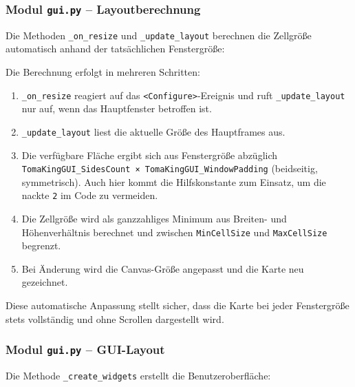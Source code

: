 
\subsubsection{Modul \texttt{gui.py} – Layoutberechnung}

Die Methoden \texttt{\_on\_resize} und \texttt{\_update\_layout} berechnen die Zellgröße automatisch anhand der tatsächlichen Fenstergröße:



Die Berechnung erfolgt in mehreren Schritten:
\begin{enumerate}
    \item \texttt{\_on\_resize} reagiert auf das \texttt{<Configure>}-Ereignis und ruft \texttt{\_update\_layout} nur auf, wenn das Hauptfenster betroffen ist.
    \item \texttt{\_update\_layout} liest die aktuelle Größe des Hauptframes aus.
    \item Die verfügbare Fläche ergibt sich aus Fenstergröße abzüglich \texttt{TomaKingGUI\_SidesCount × TomaKingGUI\_WindowPadding} (beidseitig, symmetrisch). Auch hier kommt die Hilfskonstante zum Einsatz, um die nackte \texttt{2} im Code zu vermeiden.
    \item Die Zellgröße wird als ganzzahliges Minimum aus Breiten- und Höhenverhältnis berechnet und zwischen \texttt{MinCellSize} und \texttt{MaxCellSize} begrenzt.
    \item Bei Änderung wird die Canvas-Größe angepasst und die Karte neu gezeichnet.
\end{enumerate}

Diese automatische Anpassung stellt sicher, dass die Karte bei jeder Fenstergröße stets vollständig und ohne Scrollen dargestellt wird.


\subsubsection{Modul \texttt{gui.py} – \acs{GUI}-Layout}

Die Methode \texttt{\_create\_widgets} erstellt die Benutzeroberfläche:



